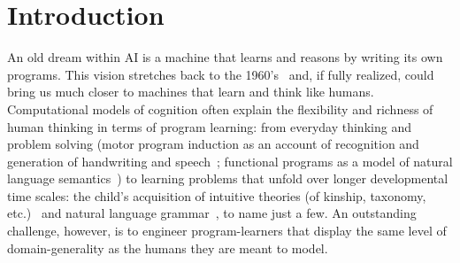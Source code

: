 \documentclass{article}
\begin{document}






\section{Introduction}


An old dream within AI is a machine that learns and reasons by writing
its own programs.  This vision stretches back to the
1960's~\cite{solomonoff1964formal} and, if fully realized, could bring
us much closer to machines that learn and think like humans.
Computational models of cognition often explain the flexibility and
richness of human thinking in terms of program learning: from everyday
thinking and problem solving (motor program induction as an account of
recognition and generation of handwriting and
speech~\cite{lake2015human}; functional programs as a model of natural
language semantics~\cite{SOMETHING}) to learning problems that unfold
over longer developmental time scales: the child's acquisition of
intuitive theories (of kinship, taxonomy, etc.)~\cite{Ullman2012} and
natural language grammar~\cite{DBLP:journals/cogsr/SchmidK11}, to name
just a few.  An outstanding challenge, however, is to engineer
program-learners that display the same level of domain-generality as
the humans they are meant to model.
\end{document}
